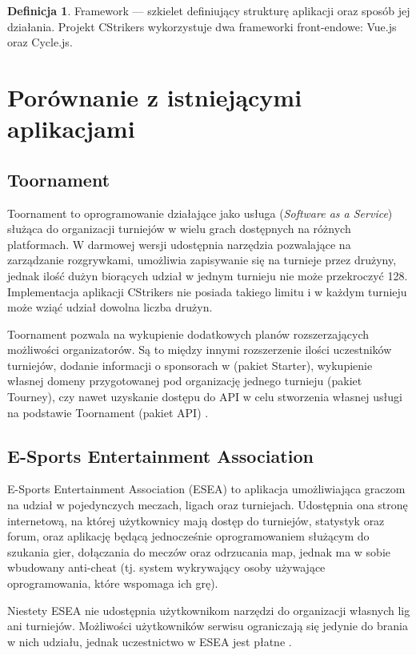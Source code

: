 \documentclass[shortabstract]{iithesis}
\theoremstyle{definition} \newtheorem{definition}{Definicja}[]
\theoremstyle{remark} \newtheorem{remark}[definition]{Observation}
\theoremstyle{plain} \newtheorem{theorem}[definition]{Theorem}
\theoremstyle{plain} \newtheorem{lemma}[definition]{Lemma}
\begin{document}
\begin{definition}
    Framework --- szkielet definiujący strukturę aplikacji oraz sposób jej działania. Projekt CStrikers wykorzystuje dwa frameworki front-endowe: Vue.js oraz Cycle.js.
\end{definition}

\section{Porównanie z istniejącymi aplikacjami}
\subsection{Toornament}
Toornament to oprogramowanie działające jako usługa (\textit{Software as a Service}) \cite{bib:toornament-saas} służąca do organizacji turniejów w wielu grach dostępnych na różnych platformach. W darmowej wersji udostępnia narzędzia pozwalające na zarządzanie rozgrywkami, umożliwia zapisywanie się na turnieje przez drużyny, jednak ilość dużyn biorących udział w jednym turnieju nie może przekroczyć 128. Implementacja aplikacji CStrikers nie posiada takiego limitu i w każdym turnieju może wziąć udział dowolna liczba drużyn.

Toornament pozwala na wykupienie dodatkowych planów rozszerzających możliwości organizatorów. Są to między innymi rozszerzenie ilości uczestników turniejów, dodanie informacji o sponsorach w (pakiet Starter), wykupienie własnej domeny przygotowanej pod organizację jednego turnieju (pakiet Tourney), czy nawet uzyskanie dostępu do API w celu stworzenia własnej usługi na podstawie Toornament (pakiet API) \cite{bib:toornament-pricing}.

\subsection{E-Sports Entertainment Association}
E-Sports Entertainment Association (ESEA) to aplikacja umożliwiająca graczom na udział w pojedynczych meczach, ligach oraz turniejach. Udostępnia ona stronę internetową, na której użytkownicy mają dostęp do turniejów, statystyk oraz forum, oraz aplikację będącą jednocześnie oprogramowaniem służącym do szukania gier, dołączania do meczów oraz odrzucania map, jednak ma w sobie wbudowany anti-cheat \cite{bib:esea-anticheat} (tj. system wykrywający osoby używające oprogramowania, które wspomaga ich grę).

Niestety ESEA nie udostępnia użytkownikom narzędzi do organizacji własnych lig ani turniejów. Możliwości użytkowników serwisu ograniczają się jedynie do brania w nich udziału, jednak uczestnictwo w ESEA jest płatne \cite{bib:esea-subscribe}.
\end{document}
